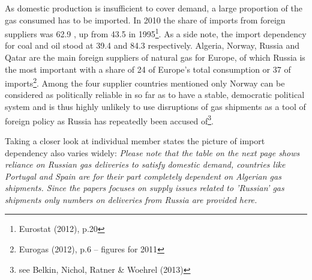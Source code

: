 \documentclass[11pt,a4paper,english]{scrreprt}
\begin{document}
As domestic production is insufficient to cover demand, a large proportion of
the gas consumed has to be imported. In 2010 the share of imports from foreign
suppliers was 62.9 \textdiscount, up from 43.5 \textdiscount{} in
1995\footnote{Eurostat (2012), p.20}. As a side note, the import dependency for
coal and oil stood at 39.4 \textdiscount{} and 84.3 \textdiscount{}
respectively. Algeria, Norway, Russia and Qatar are the main foreign suppliers
of natural gas for Europe, of which Russia is the most important with a share of
24 \textdiscount{} of Europe's total consumption or 37 \textdiscount{} of
imports\footnote{Eurogas (2012), p.6 -- figures for 2011}. Among the four
supplier countries mentioned only Norway can be considered as politically
reliable in so far as to have a stable, democratic political system and is
thus highly unlikely to use disruptions of gas shipments as a tool of foreign
policy as Russia has repeatedly been accused of\footnote{see Belkin, Nichol,
Ratner \& Woehrel (2013)}. \par

Taking a closer look at individual member states the picture of import
dependency also varies widely: \textcolor{dunkelgrau.80}{\emph{Please note that
the table on the next page shows reliance on Russian gas deliveries to satisfy
domestic demand, countries like Portugal and Spain are for their part completely
dependent on Algerian gas shipments. Since the papers focuses on supply issues
related to 'Russian' gas shipments only numbers on deliveries from Russia
are provided here.}}\par

\pagebreak

\sffamily
\end{document}
